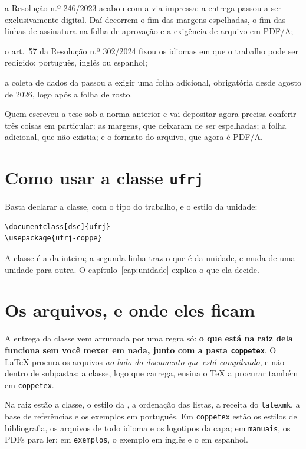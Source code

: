 \documentclass[dsc]{ufrj}
\begin{document}
  \begin{alineas}
    \item a Resolução  n.º 246/2023 acabou com a via impressa: a
      entrega passou a ser exclusivamente digital. Daí decorrem o fim das
      margens espelhadas, o fim das linhas de assinatura na folha de aprovação e
      a exigência de arquivo em PDF/A;
    \item o art.\ 57 da Resolução  n.º 302/2024 fixou os idiomas em
      que o trabalho pode ser redigido: português, inglês ou espanhol;
    \item a coleta de dados da  passou a exigir uma folha adicional,
      obrigatória desde agosto de 2026, logo após a folha de rosto.
  \end{alineas}

  Quem escreveu a tese sob a norma anterior e vai depositar agora precisa
  conferir três coisas em particular: as margens, que deixaram de ser
  espelhadas; a folha adicional, que não existia; e o formato do arquivo, que
  agora é PDF/A.

  \section{Como usar a classe \texttt{ufrj}}

  Basta declarar a classe, com o tipo do trabalho, e o estilo da unidade:

\begin{verbatim}
\documentclass[dsc]{ufrj}
\usepackage{ufrj-coppe}
\end{verbatim}

  \noindent A classe é a da  inteira; a segunda linha traz o que é
  da unidade, e muda de uma unidade para outra. O capítulo~\ref{cap:unidade}
  explica o que ela decide.

  \section{Os arquivos, e onde eles ficam}

  A entrega da classe vem arrumada por uma regra só: \textbf{o que está na raiz
  dela funciona sem você mexer em nada, junto com a pasta \texttt{coppetex}}.
  O \LaTeX{} procura os arquivos \emph{ao lado do documento que está
  compilando}, e não dentro de subpastas; a classe, logo que carrega, ensina
  o \TeX{} a procurar também em \verb|coppetex|.

  Na raiz estão a classe, o estilo da , a ordenação das listas,
  a receita do \verb|latexmk|, a base de referências e os exemplos em
  português. Em \verb|coppetex| estão os estilos de bibliografia, os arquivos
  de todo idioma e os logotipos da capa; em \verb|manuais|, os PDFs para ler; em
  \verb|exemplos|, o exemplo em inglês e o em espanhol.
\end{document}
